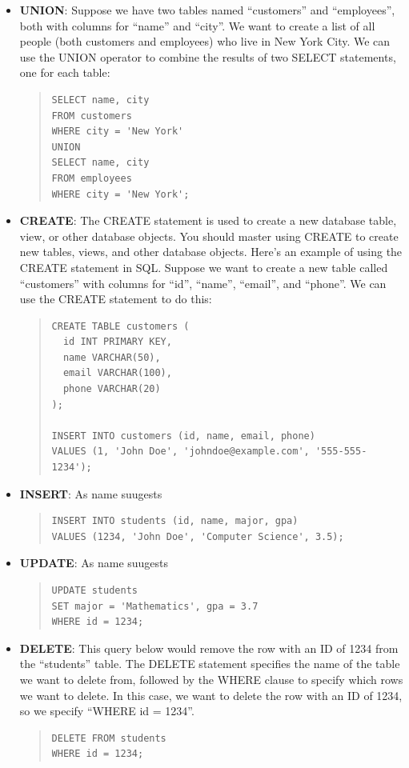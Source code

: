\documentclass[11pt]{article}
\begin{document}
\begin{itemize}
\item \textbf{UNION}:  Suppose we have two tables named “customers” and “employees”, both with columns for “name” and “city”. We want to create a list of all people (both customers and employees) who live in New York City. We can use the UNION operator to combine the results of two SELECT statements, one for each table:
\begin{quote}
\begin{verbatim}
SELECT name, city
FROM customers
WHERE city = 'New York'
UNION
SELECT name, city
FROM employees
WHERE city = 'New York';
\end{verbatim}
\end{quote}


\item \textbf{CREATE}:  The CREATE statement is used to create a new database table, view, or other database objects. You should master using CREATE to create new tables, views, and other database objects. Here’s an example of using the CREATE statement in SQL. Suppose we want to create a new table called “customers” with columns for “id”, “name”, “email”, and “phone”. We can use the CREATE statement to do this:
\begin{quote}
\begin{verbatim}
CREATE TABLE customers (
  id INT PRIMARY KEY,
  name VARCHAR(50),
  email VARCHAR(100),
  phone VARCHAR(20)
);

INSERT INTO customers (id, name, email, phone)
VALUES (1, 'John Doe', 'johndoe@example.com', '555-555-1234');
\end{verbatim}
\end{quote}


\item \textbf{INSERT}:  As name suugests
\begin{quote}
\begin{verbatim}
INSERT INTO students (id, name, major, gpa)
VALUES (1234, 'John Doe', 'Computer Science', 3.5);
\end{verbatim}
\end{quote}


\item \textbf{UPDATE}:  As name suugests
\begin{quote}
\begin{verbatim}
UPDATE students
SET major = 'Mathematics', gpa = 3.7
WHERE id = 1234;
\end{verbatim}
\end{quote}


\item \textbf{DELETE}:  This query below would remove the row with an ID of 1234 from the “students” table. The DELETE statement specifies the name of the table we want to delete from, followed by the WHERE clause to specify which rows we want to delete. In this case, we want to delete the row with an ID of 1234, so we specify “WHERE id = 1234”.
\begin{quote}
\begin{verbatim}
DELETE FROM students
WHERE id = 1234;
\end{verbatim}
\end{quote}




\end{itemize}
\end{document}
